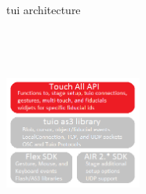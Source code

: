 \begin{frame}%
\begin{block}{tui architecture}
\begin{minipage}{1.0\linewidth}
\begin{center}
\begin{minipage}{.49\linewidth}
\includegraphics[height=70mm, width=45mm]{images/API&tuioas3lib&skds.png}$\;$ 
\end{minipage}
%
\begin{minipage}{.49\linewidth}

\end{minipage}
\end{center}
\end{minipage}
\end{block}
\end{frame}

